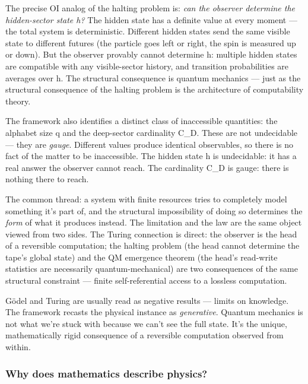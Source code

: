 \documentclass[
]{article}
\begin{document}
The precise OI analog of the halting problem is: \emph{can the observer
determine the hidden-sector state h?} The hidden state has a definite
value at every moment --- the total system is deterministic. Different
hidden states send the same visible state to different futures (the
particle goes left or right, the spin is measured up or down). But the
observer provably cannot determine h: multiple hidden states are
compatible with any visible-sector history, and transition probabilities
are averages over h. The structural consequence is quantum mechanics ---
just as the structural consequence of the halting problem is the
architecture of computability theory.

The framework also identifies a distinct class of inaccessible
quantities: the alphabet size q and the deep-sector cardinality
\textbar C\_D\textbar. These are not undecidable --- they are
\emph{gauge}. Different values produce identical observables, so there
is no fact of the matter to be inaccessible. The hidden state h is
undecidable: it has a real answer the observer cannot reach. The
cardinality \textbar C\_D\textbar{} is gauge: there is nothing there to
reach.

The common thread: a system with finite resources tries to completely
model something it's part of, and the structural impossibility of doing
so determines the \emph{form} of what it produces instead. The
limitation and the law are the same object viewed from two sides. The
Turing connection is direct: the observer is the head of a reversible
computation; the halting problem (the head cannot determine the tape's
global state) and the QM emergence theorem (the head's read-write
statistics are necessarily quantum-mechanical) are two consequences of
the same structural constraint --- finite self-referential access to a
lossless computation.

Gödel and Turing are usually read as negative results --- limits on
knowledge. The framework recasts the physical instance as
\emph{generative}. Quantum mechanics is not what we're stuck with
because we can't see the full state. It's the unique, mathematically
rigid consequence of a reversible computation observed from within.

\hypertarget{why-does-mathematics-describe-physics}{%
\subsubsection{Why does mathematics describe
physics?}\label{why-does-mathematics-describe-physics}}
\end{document}
